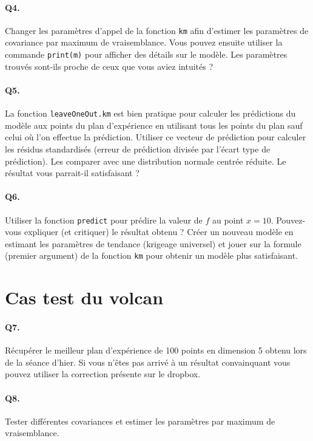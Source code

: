 \documentclass[12pt]{scrartcl}
\begin{document}
\paragraph{Q4.} Changer les paramètres d'appel de la fonction \texttt{km} afin d'estimer les paramètres de covariance par maximum de vraisemblance. Vous pouvez ensuite utiliser la commande \texttt{print(m)} pour afficher des détails sur le modèle. Les paramètres trouvés sont-ils proche de ceux que vous aviez intuités ?

\paragraph{Q5.} La fonction \texttt{leaveOneOut.km} est bien pratique pour calculer les prédictions du modèle aux points du plan d'expérience en utilisant tous les points du plan sauf celui où l'on effectue la prédiction. Utiliser ce vecteur de prédiction pour calculer les résidus standardisés (erreur de prédiction divisée par l'écart type de prédiction). Les comparer avec une distribution normale centrée réduite. Le résultat vous parrait-il satisfaisant ?  

\paragraph{Q6.} Utiliser la fonction \texttt{predict} pour prédire la valeur de $f$ au point $x=10$. Pouvez-vous expliquer (et critiquer) le résultat obtenu ? Créer un nouveau modèle en estimant les paramètres de tendance (krigeage universel) et jouer sur la formule (premier argument) de la fonction \texttt{km} pour obtenir un modèle plus satisfaisant.

\section{Cas test du volcan}

\paragraph{Q7.} Récupérer le meilleur plan d'expérience de 100 points en dimension 5 obtenu lors de la séance d'hier. Si vous n'êtes pas arrivé à un résultat convainquant vous pouvez utiliser la correction présente sur le dropbox.

\paragraph{Q8.} Tester différentes covariances et estimer les paramètres par maximum de vraisemblance.
\end{document}
